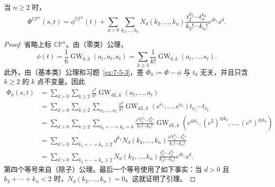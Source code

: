 \begin{lemma}\label{lem:7-5-13}
当 $n\ge2$ 时，
\[
  \Phi^{\mathbb{CP}^n}(s,t)
  =\phi^{\mathbb{CP}^n}(t)
   +\sum_{d>0}\sum_{k_2,\ldots,k_n}
    N_d(k_2,\ldots,k_n)
    \frac{t_2^{k_2}\cdots t_n^{k_n}}{k_2!\cdots k_n!}
    e^{dt_1}s^d.
\]
\end{lemma}

\begin{proof}
省略上标 $\mathbb{CP}^n$。由（零类）公理，
\[
  \phi(t)=\frac16\operatorname{GW}_{0,3}(a_t,a_t,a_t)
  =\sum_{k\ge3}\frac1{k!}\operatorname{GW}_{0,k}(a_t,\ldots,a_t).
\]
此外，由（基本类）公理和习题~\ref{ex:7-5-3}，差
$\Phi_0:=\Phi-\phi$ 与 $t_0$ 无关，并且只含 $k\ge2$ 的 $k$ 点不变量。因此
\begin{align*}
  \Phi_0(s,t)
  &=\sum_{d>0}\sum_{k\ge2}\frac{s^d}{k!}
    \operatorname{GW}_{dL,k}(a_t,\ldots,a_t)\\
  &=\sum_{d>0}\sum_{k\ge2}\sum_{\nu_1,\ldots,\nu_k}
    \frac{s^d}{k!}
    \operatorname{GW}_{dL,k}(c^{\nu_1},\ldots,c^{\nu_k})
    t_{\nu_1}\cdots t_{\nu_k}\\
  &=\sum_{d>0}\sum_{k\ge2}
    \sum_{k_1+\cdots+k_n=k}
    \frac{s^dt_1^{k_1}\cdots t_n^{k_n}}{k_1!\cdots k_n!}
    \operatorname{GW}_{dL,k}
      (c^{\otimes k_1},(c^2)^{\otimes k_2},\ldots,(c^n)^{\otimes k_n})\\
  &=\sum_{d>0}\sum_{k_1+\cdots+k_n\ge2}
    d^{k_1}N_d(k_2,\ldots,k_n)
    \frac{s^dt_1^{k_1}\cdots t_n^{k_n}}{k_1!\cdots k_n!}\\
  &=\sum_{d>0}\sum_{k_2+\cdots+k_n\ge2}
    N_d(k_2,\ldots,k_n)
    \frac{t_2^{k_2}\cdots t_n^{k_n}}{k_2!\cdots k_n!}
    e^{dt_1}s^d.
\end{align*}
第四个等号来自（除子）公理。最后一个等号使用了如下事实：当 $d>0$ 且
$k_2+\cdots+k_n<2$ 时，$N_d(k_2,\ldots,k_n)=0$。这就证明了引理。
\end{proof}

